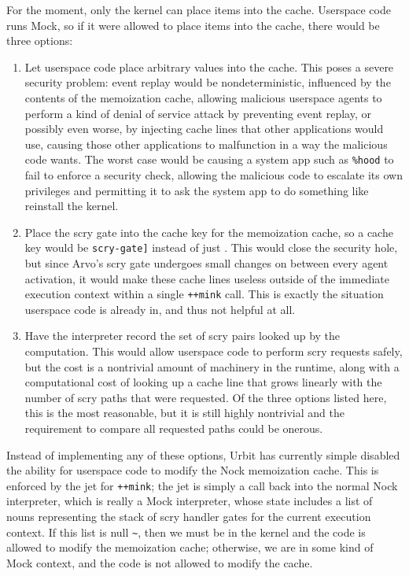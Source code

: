 \documentclass[twoside]{article}
\begin{document}
For the moment, only the kernel can place items into the cache.  Userspace code runs Mock, so if it were allowed to place items into the cache, there would be three options:

\begin{enumerate}
  \item  Let userspace code place arbitrary values into the cache.  This poses a severe security problem:  event replay would be nondeterministic, influenced by the contents of the memoization cache, allowing malicious userspace agents to perform a kind of denial of service attack by preventing event replay, or possibly even worse, by injecting cache lines that other applications would use, causing those other applications to malfunction in a way the malicious code wants.  The worst case would be causing a system app such as \texttt{\%hood} to fail to enforce a security check, allowing the malicious code to escalate its own privileges and permitting it to ask the system app to do something like reinstall the kernel.

  \item  Place the scry gate into the cache key for the memoization cache, so a cache key would be \texttt{\string[\string[subject formula\string] scry-gate\string]} instead of just \texttt{}.  This would close the security hole, but since Arvo's scry gate undergoes small changes on between every agent activation, it would make these cache lines useless outside of the immediate execution context within a single \texttt{++mink} call.  This is exactly the situation userspace code is already in, and thus not helpful at all.

  \item  Have the interpreter record the set of scry \texttt{} pairs looked up by the computation.  This would allow userspace code to perform scry requests safely, but the cost is a nontrivial amount of machinery in the runtime, along with a computational cost of looking up a cache line that grows linearly with the number of scry paths that were requested.  Of the three options listed here, this is the most reasonable, but it is still highly nontrivial and the requirement to compare all requested paths could be onerous.
\end{enumerate}

\noindent
Instead of implementing any of these options, Urbit has currently simple disabled the ability for userspace code to modify the Nock memoization cache.  This is enforced by the jet for \texttt{++mink}; the jet is simply a call back into the normal Nock interpreter, which is really a Mock interpreter, whose state includes a list of nouns representing the stack of scry handler gates for the current execution context.  If this list is null \texttt{\textasciitilde}, then we must be in the kernel and the code is allowed to modify the memoization cache; otherwise, we are in some kind of Mock context, and the code is not allowed to modify the cache.
\end{document}
